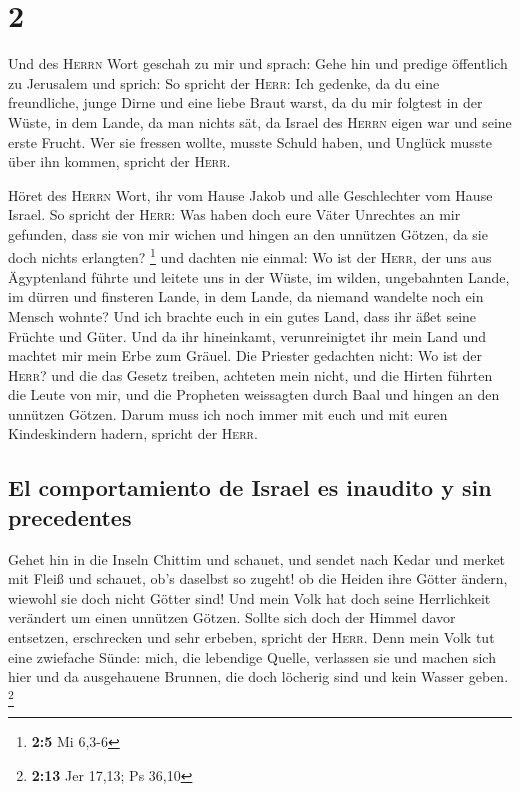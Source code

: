 \hypertarget{section-1}{%
\section{2}\label{section-1}}

 Und des \textsc{Herrn} Wort geschah zu mir und sprach:
 Gehe hin und predige öffentlich zu Jerusalem und sprich:
So spricht der \textsc{Herr}: Ich gedenke, da du eine freundliche, junge
Dirne und eine liebe Braut warst, da du mir folgtest in der Wüste, in
dem Lande, da man nichts sät,  da Israel des
\textsc{Herrn} eigen war und seine erste Frucht. Wer sie fressen wollte,
musste Schuld haben, und Unglück musste über ihn kommen, spricht der
\textsc{Herr}.

 Höret des \textsc{Herrn} Wort, ihr vom Hause Jakob und
alle Geschlechter vom Hause Israel.  So spricht der
\textsc{Herr}: Was haben doch eure Väter Unrechtes an mir gefunden, dass
sie von mir wichen und hingen an den unnützen Götzen, da sie doch nichts
erlangten? \footnote{\textbf{2:5} Mi 6,3-6}  und dachten
nie einmal: Wo ist der \textsc{Herr}, der uns aus Ägyptenland führte und
leitete uns in der Wüste, im wilden, ungebahnten Lande, im dürren und
finsteren Lande, in dem Lande, da niemand wandelte noch ein Mensch
wohnte?  Und ich brachte euch in ein gutes Land, dass ihr
äßet seine Früchte und Güter. Und da ihr hineinkamt, verunreinigtet ihr
mein Land und machtet mir mein Erbe zum Gräuel.  Die
Priester gedachten nicht: Wo ist der \textsc{Herr}? und die das Gesetz
treiben, achteten mein nicht, und die Hirten führten die Leute von mir,
und die Propheten weissagten durch Baal und hingen an den unnützen
Götzen.  Darum muss ich noch immer mit euch und mit euren
Kindeskindern hadern, spricht der \textsc{Herr}.

\hypertarget{el-comportamiento-de-israel-es-inaudito-y-sin-precedentes}{%
\subsection{El comportamiento de Israel es inaudito y sin
precedentes}\label{el-comportamiento-de-israel-es-inaudito-y-sin-precedentes}}

 Gehet hin in die Inseln Chittim und schauet, und sendet
nach Kedar und merket mit Fleiß und schauet, ob's daselbst so zugeht!
 ob die Heiden ihre Götter ändern, wiewohl sie doch nicht
Götter sind! Und mein Volk hat doch seine Herrlichkeit verändert um
einen unnützen Götzen.  Sollte sich doch der Himmel davor
entsetzen, erschrecken und sehr erbeben, spricht der \textsc{Herr}.
 Denn mein Volk tut eine zwiefache Sünde: mich, die
lebendige Quelle, verlassen sie und machen sich hier und da ausgehauene
Brunnen, die doch löcherig sind und kein Wasser geben. \footnote{\textbf{2:13}
  Jer 17,13; Ps 36,10}

